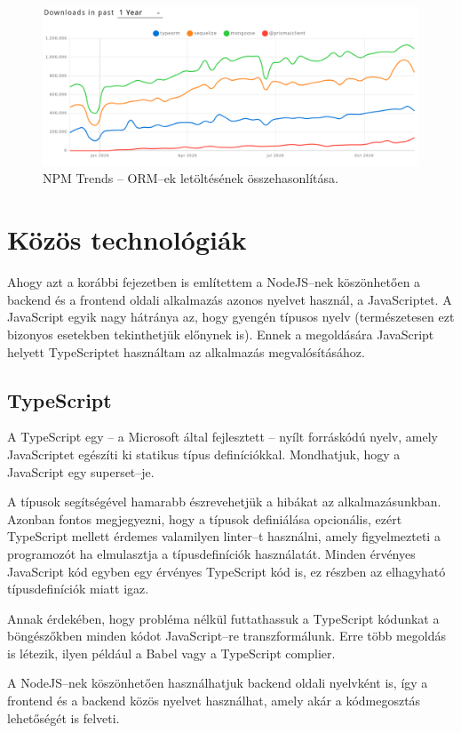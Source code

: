 \begin{figure}[!ht]
  \centering
  \includegraphics[width=150mm, keepaspectratio]{figures/orm_npm_trends.png}
  \caption{NPM Trends – ORM–ek letöltésének összehasonlítása.}
  \label{fig:ORMTrends}
\end{figure}

\section{Közös technológiák}
Ahogy azt a korábbi fejezetben is említettem a NodeJS–nek köszönhetően a backend és a frontend oldali alkalmazás azonos nyelvet használ, a JavaScriptet.
A JavaScript egyik nagy hátránya az, hogy gyengén típusos nyelv (természetesen ezt bizonyos esetekben tekinthetjük előnynek is). Ennek a megoldására JavaScript helyett TypeScriptet használtam az alkalmazás megvalósításához.

\subsection{TypeScript}

A TypeScript egy – a Microsoft által fejlesztett – nyílt forráskódú nyelv, amely JavaScriptet egészíti ki statikus típus definíciókkal. Mondhatjuk, hogy a JavaScript egy superset–je.

A típusok segítségével hamarabb észrevehetjük a hibákat az alkalmazásunkban. Azonban fontos megjegyezni, hogy a típusok definiálása opcionális, ezért TypeScript mellett érdemes valamilyen linter–t használni, amely figyelmezteti a programozót ha elmulasztja a típusdefiníciók használatát. 
Minden érvényes JavaScript kód egyben egy érvényes TypeScript kód is, ez részben az elhagyható típusdefiníciók miatt igaz.

Annak érdekében, hogy probléma nélkül futtathassuk a TypeScript kódunkat a böngészőkben minden kódot JavaScript–re transzformálunk. Erre több megoldás is létezik, ilyen például a Babel vagy a TypeScript complier.\cite{TypeScript}

A NodeJS–nek köszönhetően használhatjuk backend oldali nyelvként is, így a frontend és a backend közös nyelvet használhat, amely akár a kódmegosztás lehetőségét is felveti.

